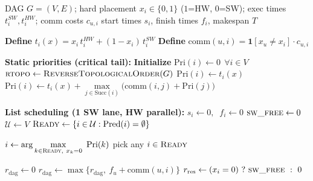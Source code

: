 

\FloatBarrier

\begin{algorithm}[t]
\caption{List Scheduling with Static Priorities (LSSP)}
\label{alg:lssp}
\begin{algorithmic}[1]
\Require DAG $G=(V,E)$; hard placement $x_i\in\{0,1\}$ ($1$=HW, $0$=SW);
        exec times $t_i^{SW},t_i^{HW}$; comm costs $c_{u,i}$
\Ensure start times $s_i$, finish times $f_i$, makespan $T$

\State \textbf{Define} $t_i(x)=x_i\,t_i^{HW}+(1-x_i)\,t_i^{SW}$
\State \textbf{Define} $\mathrm{comm}(u,i)=\mathbf{1}[x_u\neq x_i]\cdot c_{u,i}$

\Statex \textbf{Static priorities (critical tail):}
\State \textbf{Initialize} $\mathrm{Pri}(i)\gets 0\ \ \forall i\in V$
\State $\textsc{rtopo}\gets\textsc{ReverseTopologicalOrder}(G)$
    \State $\mathrm{Pri}(i)\gets t_i(x)$
        \State $\mathrm{Pri}(i)\gets t_i(x)+\max\limits_{j\in \mathrm{Succ}(i)}\Big(\mathrm{comm}(i,j)+\mathrm{Pri}(j)\Big)$
    \EndIf
\EndFor

\Statex \textbf{List scheduling (1 SW lane, HW parallel):}
 \State $s_i\gets 0,\;\; f_i\gets 0$ \EndFor
\State $\textsc{sw\_free}\gets 0$
\State $\mathcal{U}\gets V$ 
\State $\textsc{Ready}\gets \{i\in \mathcal{U}:\mathrm{Pred}(i)=\emptyset\}$

        \State $i\gets \arg\max\limits_{k\in \textsc{Ready},\ x_k=0}\ \mathrm{Pri}(k)$
    \Else
        \State pick any $i\in \textsc{Ready}$ 
    \EndIf

    \State $r_{\mathrm{dag}}\gets 0$
        \State $r_{\mathrm{dag}}\gets \max\Big\{r_{\mathrm{dag}},\ f_u+\mathrm{comm}(u,i)\Big\}$
    \EndFor
    \State $r_{\mathrm{res}}\gets (x_i=0)\ ?\ \textsc{sw\_free}\ :\ 0$


\end{algorithmic}
\end{algorithm}
